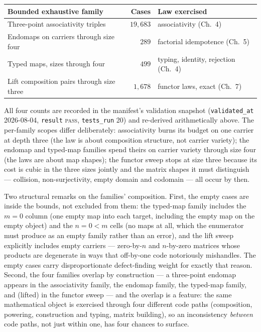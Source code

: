 \begin{center}
\begin{tabular}{@{}lrl@{}}
\toprule
Bounded exhaustive family & Cases & Law exercised \\
\midrule
Three-point associativity triples & $19{,}683$ & associativity (Ch.~4) \\
Endomaps on carriers through size four & $289$ & factorial idempotence (Ch.~5) \\
Typed maps, sizes through four & $499$ & typing, identity, rejection (Ch.~4) \\
Lift composition pairs through size three & $1{,}678$ & functor laws, exact (Ch.~7) \\
\bottomrule
\end{tabular}
\end{center}

All four counts are recorded in the manifest's validation snapshot
(\texttt{validated\_at} 2026-08-04, \texttt{result} \textsc{pass},
\texttt{tests\_run} 20) and re-derived arithmetically above. The
per-family scopes differ deliberately: associativity burns its budget on
one carrier at depth three (the law is about composition structure, not
carrier variety); the endomap and typed-map families spend theirs on
carrier variety through size four (the laws are about map shapes); the
functor sweep stops at size three because its cost is cubic in the three
sizes jointly and the matrix shapes it must distinguish --- collision,
non-surjectivity, empty domain and codomain --- all occur by then.

Two structural remarks on the families' composition. First, the empty
cases are inside the bounds, not excluded from them: the typed-map family
includes the $m = 0$ column (one empty map into each target, including
the empty map on the empty object) and the $n = 0 < m$ cells (no maps at
all, which the enumerator must produce as an empty family rather than an
error), and the lift sweep explicitly includes empty carriers ---
zero-by-$n$ and $n$-by-zero matrices whose products are degenerate in
ways that off-by-one code notoriously mishandles. The empty cases carry
disproportionate defect-finding weight for exactly that reason. Second,
the four families overlap by construction --- a three-point endomap
appears in the associativity family, the endomap family, the typed-map
family, and (lifted) in the functor sweep --- and the overlap is a
feature: the same mathematical object is exercised through four
different code paths (composition, powering, construction and typing,
matrix building), so an inconsistency \emph{between} code paths, not
just within one, has four chances to surface.

